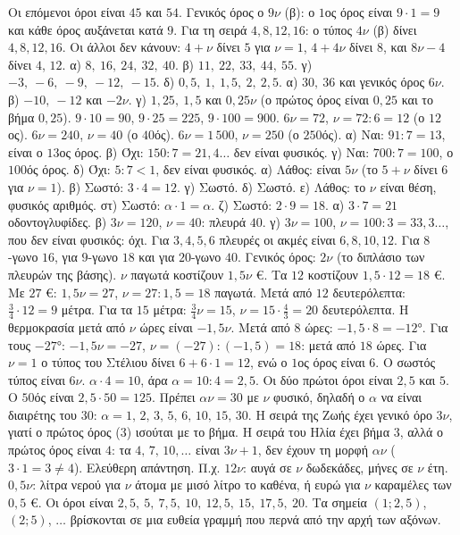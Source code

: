  Οι επόμενοι όροι είναι $45$ και $54$. Γενικός όρος ο $9\nu$ (β): ο $1$ος όρος είναι $9\cdot1=9$ και κάθε όρος αυξάνεται κατά $9$. Για τη σειρά $4,8,12,16$: ο τύπος $4\nu$ (β) δίνει $4,8,12,16$. Οι άλλοι δεν κάνουν: $4+\nu$ δίνει $5$ για $\nu=1$, $4+4\nu$ δίνει $8$, και $8\nu-4$ δίνει $4$, $12$.
 α) $8,\ 16,\ 24,\ 32,\ 40$. β) $11,\ 22,\ 33,\ 44,\ 55$. γ) $-3,\ -6,\ -9,\ -12,\ -15$. δ) $0{,}5,\ 1,\ 1{,}5,\ 2,\ 2{,}5$.
 α) $30,\ 36$ και γενικός όρος $6\nu$. β) $-10,\ -12$ και $-2\nu$. γ) $1{,}25,\ 1{,}5$ και $0{,}25\nu$ (ο πρώτος όρος είναι $0{,}25$ και το βήμα $0{,}25$).
 $9\cdot10=90$, $9\cdot25=225$, $9\cdot100=900$.
 $6\nu=72$, $\nu=72:6=12$ (ο $12$ος). $6\nu=240$, $\nu=40$ (ο $40$ός). $6\nu=1\,500$, $\nu=250$ (ο $250$ός).
 α) Ναι: $91:7=13$, είναι ο $13$ος όρος. β) Όχι: $150:7=21{,}4\ldots$ δεν είναι φυσικός. γ) Ναι: $700:7=100$, ο $100$ός όρος. δ) Όχι: $5:7<1$, δεν είναι φυσικός.
 α) Λάθος: είναι $5\nu$ (το $5+\nu$ δίνει $6$ για $\nu=1$). β) Σωστό: $3\cdot4=12$. γ) Σωστό. δ) Σωστό. ε) Λάθος: το $\nu$ είναι θέση, φυσικός αριθμός. στ) Σωστό: $\alpha\cdot1=\alpha$. ζ) Σωστό: $2\cdot9=18$.
 α) $3\cdot7=21$ οδοντογλυφίδες. β) $3\nu=120$, $\nu=40$: πλευρά $40$. γ) $3\nu=100$, $\nu=100:3=33{,}3\ldots$, που δεν είναι φυσικός: όχι.
 Για $3,4,5,6$ πλευρές οι ακμές είναι $6,8,10,12$. Για $8$-γωνο $16$, για $9$-γωνο $18$ και για $20$-γωνο $40$. Γενικός όρος: $2\nu$ (το διπλάσιο των πλευρών της βάσης).
 $\nu$ παγωτά κοστίζουν $1{,}5\nu$ €. Τα $12$ κοστίζουν $1{,}5\cdot12=18$ €. Με $27$ €: $1{,}5\nu=27$, $\nu=27:1{,}5=18$ παγωτά.
 Μετά από $12$ δευτερόλεπτα: $\frac{3}{4}\cdot12=9$ μέτρα. Για τα $15$ μέτρα: $\frac{3}{4}\nu=15$, $\nu=15\cdot\frac{4}{3}=20$ δευτερόλεπτα.
 Η θερμοκρασία μετά από $\nu$ ώρες είναι $-1{,}5\nu$. Μετά από $8$ ώρες: $-1{,}5\cdot8=-12$°. Για τους $-27$°: $-1{,}5\nu=-27$, $\nu=(-27):(-1{,}5)=18$: μετά από $18$ ώρες.
 Για $\nu=1$ ο τύπος του Στέλιου δίνει $6+6\cdot1=12$, ενώ ο $1$ος όρος είναι $6$. Ο σωστός τύπος είναι $6\nu$.
 $\alpha\cdot4=10$, άρα $\alpha=10:4=2{,}5$. Οι δύο πρώτοι όροι είναι $2{,}5$ και $5$. Ο $50$ός είναι $2{,}5\cdot50=125$.
 Πρέπει $\alpha\nu=30$ με $\nu$ φυσικό, δηλαδή ο $\alpha$ να είναι διαιρέτης του $30$: $\alpha=1,\,2,\,3,\,5,\,6,\,10,\,15,\,30$.
 Η σειρά της Ζωής έχει γενικό όρο $3\nu$, γιατί ο πρώτος όρος ($3$) ισούται με το βήμα. Η σειρά του Ηλία έχει βήμα $3$, αλλά ο πρώτος όρος είναι $4$: τα $4,\,7,\,10,\dots$ είναι $3\nu+1$, δεν έχουν τη μορφή $\alpha\nu$ ($3\cdot1=3\neq4$).
 Ελεύθερη απάντηση. Π.χ. $12\nu$: αυγά σε $\nu$ δωδεκάδες, μήνες σε $\nu$ έτη. $0{,}5\nu$: λίτρα νερού για $\nu$ άτομα με μισό λίτρο το καθένα, ή ευρώ για $\nu$ καραμέλες των $0{,}5$ €.
 Οι όροι είναι $2{,}5,\ 5,\ 7{,}5,\ 10,\ 12{,}5,\ 15,\ 17{,}5,\ 20$. Τα σημεία $(1;2{,}5)$, $(2;5)$, $\dots$ βρίσκονται σε μια ευθεία γραμμή που περνά από την αρχή των αξόνων.

